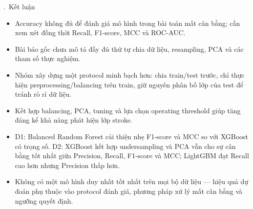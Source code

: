\documentclass[aspectratio=169,11pt]{beamer}
\newcounter{slideno}
\newcommand{\slidetitle}[2][]{%
  \refstepcounter{slideno}%
  \ifblank{#1}{}{\label{#1}}%
  \theslideno.\ #2%
}
\begin{document}
\begin{frame}{\slidetitle{Kết luận}}
\begin{itemize}
  \item Accuracy không đủ để đánh giá mô hình trong bài toán mất cân bằng; cần xem xét đồng thời Recall, F1-score, MCC và ROC-AUC.
  \item Bài báo gốc chưa mô tả đầy đủ thứ tự chia dữ liệu, resampling, PCA và các tham số thực nghiệm.
  \item Nhóm xây dựng một protocol minh bạch hơn: chia train/test trước, chỉ thực hiện preprocessing/balancing trên train, giữ nguyên phân bố lớp của test để tránh rò rỉ dữ liệu.
  \item Kết hợp balancing, PCA, tuning và lựa chọn operating threshold giúp tăng đáng kể khả năng phát hiện lớp stroke.
  \item D1: Balanced Random Forest cải thiện nhẹ F1-score và MCC so với XGBoost có trọng số. D2: XGBoost kết hợp undersampling và PCA vẫn cho sự cân bằng tốt nhất giữa Precision, Recall, F1-score và MCC; LightGBM đạt Recall cao hơn nhưng Precision thấp hơn.
  \item Không có một mô hình duy nhất tốt nhất trên mọi bộ dữ liệu — hiệu quả dự đoán phụ thuộc vào protocol đánh giá, phương pháp xử lý mất cân bằng và ngưỡng quyết định.
\end{itemize}
\end{frame}
\end{document}
